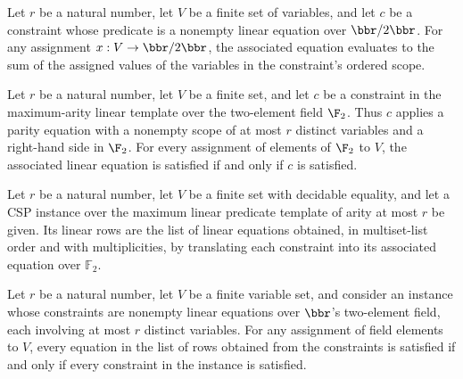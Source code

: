 \begin{theorem}
\leanok
{}
Let $r$ be a natural number, let $V$ be a finite set of variables, and let $c$ be a
constraint whose predicate is a nonempty linear equation over $\bbr/2\bbr$. For any
assignment $x:V\to\bbr/2\bbr$, the associated equation evaluates to the sum of the
assigned values of the variables in the constraint’s ordered scope.
\end{theorem}

\begin{theorem}
\leanok
{}
Let $r$ be a natural number, let $V$ be a finite set, and let $c$ be a constraint in the
maximum-arity linear template over the two-element field $\F_2$. Thus $c$ applies a
parity equation with a nonempty scope of at most $r$ distinct variables and a right-hand
side in $\F_2$. For every assignment of elements of $\F_2$ to $V$, the associated linear
equation is satisfied if and only if $c$ is satisfied.
\end{theorem}

\begin{definition}
\label{FABL.CSPInstance.linearRows}
\leanok
{}
Let $r$ be a natural number, let $V$ be a finite set with decidable equality, and let a
CSP instance over the maximum linear predicate template of arity at most $r$ be given.
Its linear rows are the list of linear equations obtained, in multiset-list order and
with multiplicities, by translating each constraint into its associated equation over
$\mathbb F_2$.
\end{definition}

\begin{theorem}
\label{FABL.CSPInstance.satisfiesRows_linearRows_iff}
\leanok
{}
Let $r$ be a natural number, let $V$ be a finite variable set, and consider an instance
whose constraints are nonempty linear equations over $\bbr$'s two-element field, each
involving at most $r$ distinct variables. For any assignment of field elements to $V$,
every equation in the list of rows obtained from the constraints is satisfied if and
only if every constraint in the instance is satisfied.
\end{theorem}

